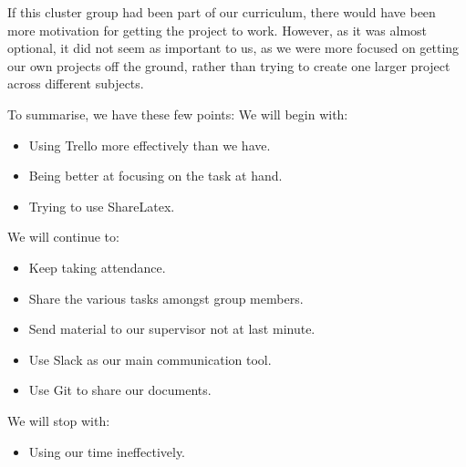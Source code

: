 \documentclass{article}
\begin{document}
If this cluster group had been part of our curriculum, there would have been more motivation for getting the project to work.
However, as it was almost optional, it did not seem as important to us, as we were more focused on getting our own projects off the ground, rather than trying to create one larger project across different subjects.
\vspace{12pt}

To summarise, we have these few points:
We will begin with:
\begin{itemize}
\item Using Trello more effectively than we have.
\item Being better at focusing on the task at hand.
\item Trying to use ShareLatex.
\end{itemize}

We will continue to:
\begin{itemize}
\item Keep taking attendance.
\item Share the various tasks amongst group members.
\item Send material to our supervisor not at last minute.
\item Use Slack as our main communication tool.
\item Use Git to share our documents.
\end{itemize}

We will stop with:
\begin{itemize}
\item Using our time ineffectively.
\end{itemize}
\end{document}
